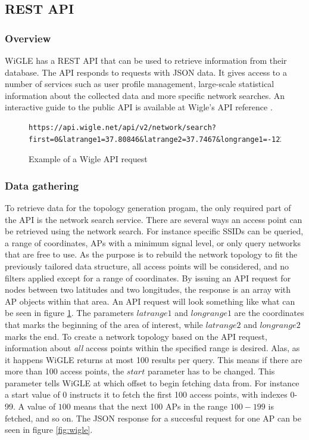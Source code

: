	\subsection{REST API}
	\subsubsection{Overview}
	WiGLE has a REST API that can be used to retrieve information from their database. The API responds to requests with JSON data. It gives access to a
	number of services such as user profile management, large-scale statistical information about the collected data
	and more specific network searches. An interactive guide to the public API is available at Wigle's API reference \cite{WigleAPI}. 

\begin{figure}
	\scriptsize
	\begin{lstlisting}[breaklines]
	 https://api.wigle.net/api/v2/network/search?first=0&latrange1=37.80846&latrange2=37.7467&longrange1=-122.5392&longrange2=-122.3813&start=0
	\end{lstlisting}
	\caption{Example of a Wigle API request}
	\label{fig:wigReq}
\end{figure}


	\subsubsection{Data gathering}
	To retrieve data for the topology generation progam, the only required part of the API is the network search service. There are several ways an access point can be retrieved using
	the network search. For instance specific SSIDs can be queried, a range of coordinates, APs with a minimum signal level, or only query networks that are free to use. As 
	the purpose is to rebuild the network topology to fit the previously tailored data structure, all access points will be considered, and no filters applied except for a range of coordinates.
	By issuing an API request for nodes between two latitudes and two longitudes, the response is an array with AP objects within that area.  
	An API request will look something like what can be seen in figure \ref{fig:wigReq}. 
	The parameters $latrange1$ and $longrange1$ are the coordinates that marks the beginning of the area of interest, while $latrange2$ and $longrange2$ marks the end. 
	To create a network topology based on the API request, information about \textit{all} access points within the specified range is desired. Alas, as it happens
	WiGLE returns at most 100 results per query. This means if there are more than 100 access points, the $start$
	parameter has to be changed. This parameter tells WiGLE at which offset to begin fetching data from. For instance a start value of $0$ instructs it to fetch the first 100 access points, with indexes 0-99. A value of $100$ means that the next 100 APs in the range $100-199$ is fetched, and so on. The JSON response for a succesful request for one AP can be seen in figure \ref{fig:wigle}. 

